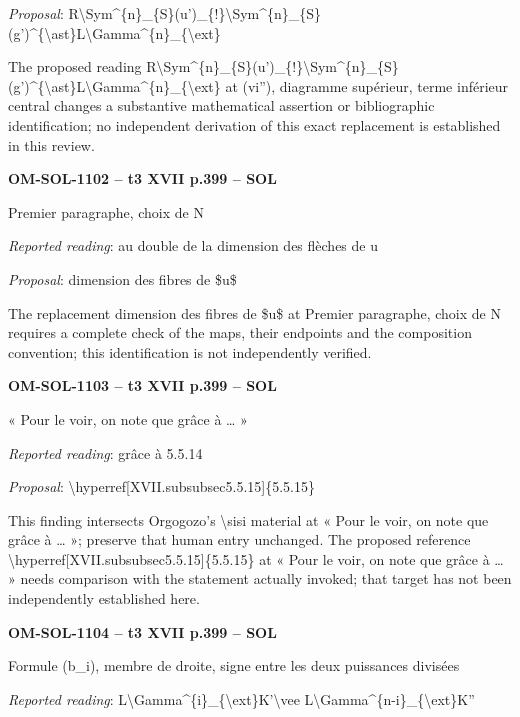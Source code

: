 \emph{Proposal}: R\textbackslash{}Sym\textasciicircum{}\{n\}\_\{S\}(u')\_\{!\}\textbackslash{}Sym\textasciicircum{}\{n\}\_\{S\}(g')\textasciicircum{}\{\textbackslash{}ast\}L\textbackslash{}Gamma\textasciicircum{}\{n\}\_\{\textbackslash{}ext\}\par
The proposed reading R\textbackslash{}Sym\textasciicircum{}\{n\}\_\{S\}(u')\_\{!\}\textbackslash{}Sym\textasciicircum{}\{n\}\_\{S\}(g')\textasciicircum{}\{\textbackslash{}ast\}L\textbackslash{}Gamma\textasciicircum{}\{n\}\_\{\textbackslash{}ext\} at (vi''), diagramme supérieur, terme inférieur central changes a substantive mathematical assertion or bibliographic identification; no independent derivation of this exact replacement is established in this review.\par
\par\noindent\textbf{OM-SOL-1102 -- t3 XVII p.399 -- SOL}\par
Premier paragraphe, choix de N\par
\emph{Reported reading}: au double de la dimension des flèches de u\par
\emph{Proposal}: dimension des fibres de \$u\$\par
The replacement dimension des fibres de \$u\$ at Premier paragraphe, choix de N requires a complete check of the maps, their endpoints and the composition convention; this identification is not independently verified.\par
\par\noindent\textbf{OM-SOL-1103 -- t3 XVII p.399 -- SOL}\par
« Pour le voir, on note que grâce à … »\par
\emph{Reported reading}: grâce à 5.5.14\par
\emph{Proposal}: \textbackslash{}hyperref[XVII.subsubsec5.5.15]\{5.5.15\}\par
This finding intersects Orgogozo's \textbackslash{}sisi material at « Pour le voir, on note que grâce à … »; preserve that human entry unchanged. The proposed reference \textbackslash{}hyperref[XVII.subsubsec5.5.15]\{5.5.15\} at « Pour le voir, on note que grâce à … » needs comparison with the statement actually invoked; that target has not been independently established here.\par
\par\noindent\textbf{OM-SOL-1104 -- t3 XVII p.399 -- SOL}\par
Formule (b\_i), membre de droite, signe entre les deux puissances divisées\par
\emph{Reported reading}: L\textbackslash{}Gamma\textasciicircum{}\{i\}\_\{\textbackslash{}ext\}K'\textbackslash{}vee L\textbackslash{}Gamma\textasciicircum{}\{n-i\}\_\{\textbackslash{}ext\}K''\par

